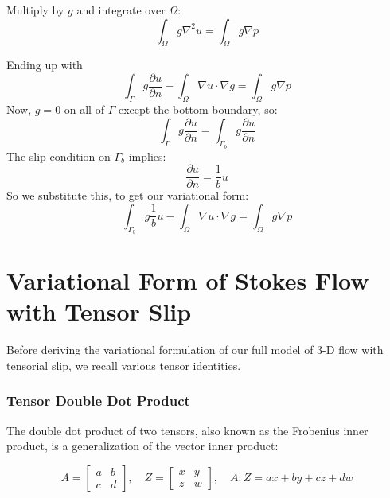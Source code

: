 \documentclass[12pt, a4paper, twoside, openright]{book}
\begin{document}
Multiply  by $g$ and integrate over $\Omega$:
\begin{equation}
\int_{\Omega} g \nabla^2 u = \int_{\Omega} g \nabla p
\end{equation}

Ending up with
\begin{equation}
\int_{\Gamma} g \frac{\partial u}{\partial n}
 - \int_{\Omega} \nabla u \cdot \nabla g  
= \int_{\Omega} g \nabla p
\end{equation}
Now, $g=0$ on all of $\Gamma$ except the bottom boundary, so:
\begin{equation}
\int_{\Gamma} g \frac{\partial u}{\partial n}
= \int_{\Gamma_b} g \frac{\partial u}{\partial n}
\end{equation}
The slip condition on $\Gamma_b$ implies:
\begin{equation}
\frac{\partial u}{\partial n} = \frac{1}{b}u
\end{equation}
So we substitute this, to get our variational form:
\begin{equation}
\int_{\Gamma_b} g \frac{1}{b} u 
 - \int_{\Omega} \nabla u \cdot \nabla g  
= \int_{\Omega} g \nabla p
\end{equation}


\section*{Variational Form of Stokes Flow with Tensor Slip}

Before deriving the variational formulation of our full model of 3-D flow with tensorial slip, we recall various tensor identities.

\subsubsection*{Tensor Double Dot Product}

The double dot product of two tensors, also known as the Frobenius inner product, is a generalization of the vector inner product:

\begin{equation*}
A = 
\begin{bmatrix}
a & b \\
c & d
\end{bmatrix}
, \quad Z = 
\begin{bmatrix}
x & y \\
z & w
\end{bmatrix}
, \quad
A:Z = ax + by + cz + dw
\end{equation*}
\end{document}
